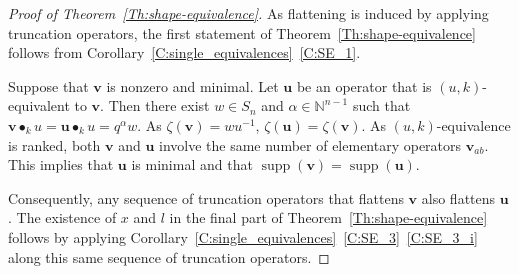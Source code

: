 \documentclass[12pt,oneside,reqno]{amsart}
\theoremstyle{definition}
\numberwithin{equation}{section}
\newcommand{\NN}{{\mathbb N}}
\newcommand{\qu}{{\mathbf u}}
\newcommand{\qv}{{\mathbf v}}
\DeclareMathOperator{\supp}{supp}
\DeclareMathOperator{\kactionop}{{\scriptstyle \bullet}}
\newcommand{\kaction}[1][k]{\kactionop_{#1}}
\begin{document}
\begin{proof}[Proof of Theorem~\ref{Th:shape-equivalence}]
  As flattening is induced by applying truncation operators, the first statement of Theorem~\ref{Th:shape-equivalence} follows
  from Corollary~\ref{C:single_equivalences}~\ref{C:SE_1}.

  Suppose that $\qv$ is nonzero and minimal.
  Let $\qu$ be an operator that is $(u,k)$-equivalent to $\qv$.
  Then there exist $w\in S_n$ and $\alpha\in\NN^{n-1}$ such that $\qv\kaction u=\qu\kaction u=q^\alpha w$.
  As $\zeta(\qv)=wu^{-1}$, $\zeta(\qu)=\zeta(\qv)$.
  As $(u,k)$-equivalence is ranked, both $\qv$ and $\qu$ involve the same number of elementary operators $\qv_{ab}$.
  This implies that $\qu$ is minimal and that $\supp(\qv)=\supp(\qu)$.

  Consequently, any sequence of truncation operators that flattens $\qv$ also flattens $\qu$.
  The existence of $x$ and $l$ in the final part of Theorem~\ref{Th:shape-equivalence} follows by applying 
  Corollary~\ref{C:single_equivalences}~\ref{C:SE_3}~\ref{C:SE_3_i} along  this same sequence of truncation operators.  
\end{proof}


\end{document}
